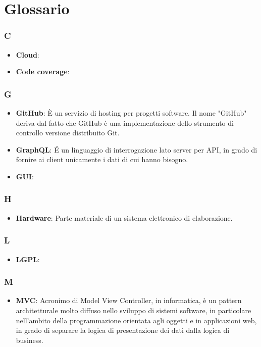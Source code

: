 \appendix

\section{Glossario}

\subsubsection{C}
\begin{itemize}
	\item \textbf{Cloud}:
	\item \textbf{Code coverage}:
\end{itemize}

\subsubsection{G}
\begin{itemize}
	\item \textbf{GitHub}: È un servizio di hosting per progetti software. Il nome "GitHub" deriva dal fatto che
GitHub è una implementazione dello strumento di controllo versione distribuito Git.
\item \textbf{GraphQL}: É un linguaggio di interrogazione lato server per API, in grado di fornire ai client unicamente i dati di cui hanno bisogno.
\item \textbf{GUI}:
\end{itemize}

\subsubsection{H}
\begin{itemize}
	\item \textbf{Hardware}: Parte materiale di un sistema elettronico di elaborazione.
\end{itemize}

\subsubsection{L}
\begin{itemize}
\item \textbf{LGPL}:
\end{itemize}

\subsubsection{M}
\begin{itemize}
\item \textbf{MVC}: Acronimo di Model View Controller, in informatica, è un pattern architetturale molto diffuso nello sviluppo di sistemi software, in particolare nell'ambito della programmazione orientata agli oggetti e in applicazioni web, in grado di separare la logica di presentazione dei dati dalla logica di business.
\end{itemize}

